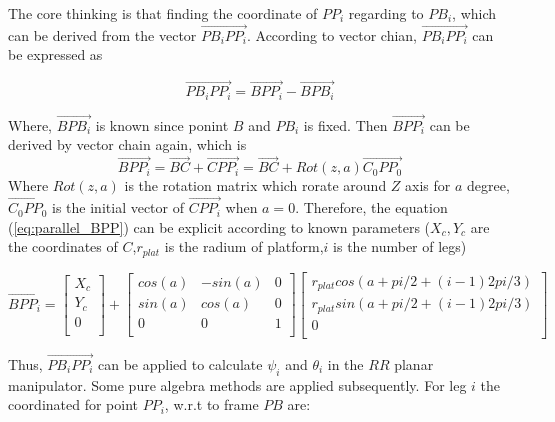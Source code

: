 \documentclass{article}
\begin{document}
The core thinking is that finding the coordinate of $PP_i$ regarding to $PB_i$, which can be derived from the vector  $\overrightarrow{PB_i PP_i}$. According to vector chian, $\overrightarrow{PB_i PP_i}$ can be expressed as

\begin{equation}
\overrightarrow{PB_i PP_i} = \overrightarrow{B PP_i} - \overrightarrow{B PB_i}
\end{equation}

Where, $\overrightarrow{B PB_i}$ is known since ponint $B$ and $PB_i$ is fixed. Then $\overrightarrow{B PP_i}$ can be derived by vector chain again, which is
\begin{equation}
\label{eq:parallel_BPP}
\overrightarrow{B PP_i} = \overrightarrow{BC} + \overrightarrow{C PP_i} = \overrightarrow{BC} + Rot(z,a)\overrightarrow{C_0PP_0} 
\end{equation}
Where $Rot(z,a)$ is the rotation matrix which rorate around $Z$ axis for $a$ degree, $\overrightarrow{C_0PP_0}$ is the initial vector of $\overrightarrow{C PP_i}$ when $a=0$. Therefore, the equation (\ref{eq:parallel_BPP}) can be explicit according to known parameters ($X_c,Y_c$ are the coordinates of $C$,$r_{plat}$ is the radium of platform,$i$ is the number of legs)

\begin{equation}
\overrightarrow{B PP_i} =
\left[\begin{array}{ccc}
	X_c \\
	Y_c \\
	0 \\
\end{array}\right] 
+ \left[\begin{array}{ccc}
	cos(a) & -sin(a) & 0 \\
	sin(a) & cos(a)  & 0 \\
	0      & 0       & 1 \\
\end{array}\right]
\left[\begin{array}{ccc}
	r_{plat}cos(a+pi/2+(i-1)2pi/3) \\
	r_{plat}sin(a+pi/2+(i-1)2pi/3) \\
	0      \\
\end{array}\right]
\end{equation}

Thus, $\overrightarrow{PB_i PP_i}$ can be applied to calculate $\psi_i$ and $\theta_i$ in the $RR$ planar manipulator. Some pure algebra methods are applied subsequently.
For leg $i$ the coordinated for point $PP_i$, w.r.t to frame ${PB}$ are:
\end{document}
